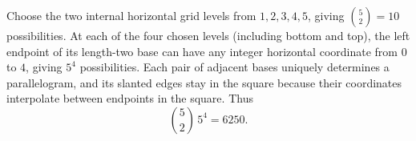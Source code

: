 Choose the two internal horizontal grid levels from $1,2,3,4,5$, giving $\binom52=10$ possibilities. At each of the four chosen levels (including bottom and top), the left endpoint of its length-two base can have any integer horizontal coordinate from $0$ to $4$, giving $5^4$ possibilities. Each pair of adjacent bases uniquely determines a parallelogram, and its slanted edges stay in the square because their coordinates interpolate between endpoints in the square. Thus
\[
\boxed{\binom52\,5^4=6250}.
\]
